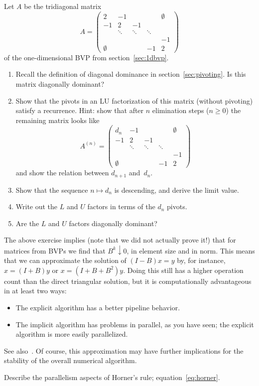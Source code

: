 \begin{exercise}
  Let $A$ be the tridiagonal matrix
\[ A=
\begin{pmatrix}
  2&-1&&&\emptyset\\ -1&2&-1\\ &\ddots&\ddots&\ddots\\
  &&&&-1\\ \emptyset&&&-1&2
\end{pmatrix}
\]
of the one-dimensional \ac{BVP} from section~\ref{sec:1dbvp}.
\begin{enumerate}
\item Recall the definition of diagonal dominance in
  section~\ref{sec:pivoting}. Is this matrix diagonally dominant?
\item Show that the pivots in an LU factorization of this matrix
  (without pivoting) satisfy a recurrence.  Hint: show that after $n$
  elimination steps ($n\geq0$) the remaining matrix looks like
\[ A^{(n)}=
\begin{pmatrix}
  d_n&-1&&&\emptyset\\ -1&2&-1\\ &\ddots&\ddots&\ddots\\
  &&&&-1\\ \emptyset&&&-1&2
\end{pmatrix}
\]
  and show the relation between $d_{n+1}$ and~$d_n$.
\item Show that the sequence $n\mapsto d_n$ is descending, and derive
  the limit value.
\item Write out the $L$ and $U$ factors in terms of the $d_n$ pivots.
\item Are the $L$ and $U$ factors diagonally dominant?
\end{enumerate}
\end{exercise}


The above exercise implies (note that we did not actually prove it!)
that for matrices from \acp{BVP} we find that $B^k\downarrow0$, in
element size and in norm. This means that we can approximate the solution
of $(I-B)x=y$ by, for instance, $x=(I+B)y$ or $x=(I+B+B^2)y$. 
%
Doing this still has a higher operation count than the direct
triangular solution, but it is computationally advantageous in at
least two ways:
\begin{itemize}
\item The explicit algorithm has a better pipeline behavior.
\item The implicit algorithm has problems in parallel, as you have
  seen; the explicit algorithm is more easily parallelized.
\end{itemize}
See also~\cite{vdVo:vectorizablevariant}.
Of course, this
approximation may have further implications for the stability of the
overall numerical algorithm.

\begin{exercise}
  Describe the parallelism aspects of Horner's rule;
  equation~\eqref{eq:horner}.
\end{exercise}


